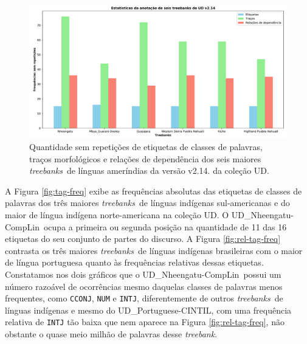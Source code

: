\documentclass[portuguese]{textolivre}
\newcommand{\udc}{coleção UD}
\newcommand{\tbc}{UD\_Nheengatu-CompLin}
\newcommand{\tbs}{\textit{treebanks}}
\newcommand{\tb}{\textit{treebank}}
\begin{document}
\begin{figure}[htbp]
  \centering
  \begin{minipage}{.75\textwidth}
    \includegraphics[width=\linewidth]{figures/TreebankStats6TBs.pdf}
    \caption{Quantidade sem repetições de etiquetas de classes de palavras, traços morfológicos e relações de dependência dos seis maiores \tbs~de línguas ameríndias da versão v2.14. da \udc.}
    \label{fig:treebank-stats}
  \end{minipage}
\end{figure}

A Figura \ref{fig:tag-freq} exibe as frequências absolutas das etiquetas de classes de palavras dos três maiores \tbs~de línguas indígenas sul-americanas e do maior de língua indígena norte-americana na \udc. O \tbc~ocupa a primeira ou segunda posição na quantidade de 11 das 16 etiquetas do seu conjunto de partes do discurso. A Figura \ref{fig:rel-tag-freq} contrasta os três maiores \tbs~de línguas indígenas brasileiras com o maior de língua portuguesa quanto às frequências relativas dessas etiquetas. Constatamos nos dois gráficos que o \tbc~possui um número razoável de ocorrências mesmo daquelas classes de palavras menos frequentes, como \texttt{CCONJ}, \texttt{NUM} e \texttt{INTJ}, diferentemente de outros \tbs~de línguas indígenas e mesmo do UD\_Portuguese-CINTIL, com uma frequência relativa de \texttt{INTJ} tão baixa que nem aparece na Figura \ref{fig:rel-tag-freq}, não obstante o quase meio milhão de palavras desse \tb. 
\end{document}
